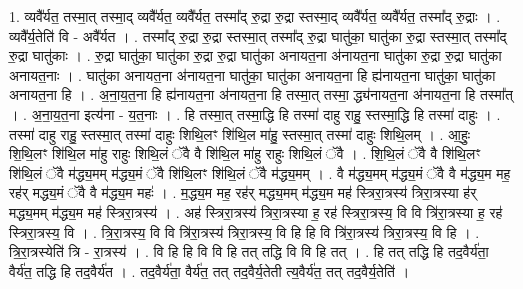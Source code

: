 \documentclass[17pt]{extarticle}
\begin{document}
1. व्यवै᳚र्यत॒ तस्मा॒त् तस्मा॒द् व्यवै᳚र्यत॒ व्यवै᳚र्यत॒ तस्मा᳚द् रु॒द्रा रु॒द्रा स्तस्मा॒द् व्यवै᳚र्यत॒ व्यवै᳚र्यत॒ तस्मा᳚द् रु॒द्राः । . व्यवै᳚र्य॒तेति॑ वि - अवै᳚र्यत । . तस्मा᳚द् रु॒द्रा रु॒द्रा स्तस्मा॒त् तस्मा᳚द् रु॒द्रा घातु॑का॒ घातु॑का रु॒द्रा स्तस्मा॒त् तस्मा᳚द् रु॒द्रा घातु॑काः । . रु॒द्रा घातु॑का॒ घातु॑का रु॒द्रा रु॒द्रा घातु॑का अनायत॒ना अ॑नायत॒ना घातु॑का रु॒द्रा रु॒द्रा घातु॑का अनायत॒नाः । . घातु॑का अनायत॒ना अ॑नायत॒ना घातु॑का॒ घातु॑का अनायत॒ना हि ह्य॑नायत॒ना घातु॑का॒ घातु॑का अनायत॒ना हि । . अ॒ना॒य॒त॒ना हि ह्य॑नायत॒ना अ॑नायत॒ना हि तस्मा॒त् तस्मा॒ द्ध्य॑नायत॒ना अ॑नायत॒ना हि तस्मा᳚त् । . अ॒ना॒य॒त॒ना इत्य॑ना - य॒त॒नाः । . हि तस्मा॒त् तस्मा॒द्धि हि तस्मा॑ दाहु राहु॒ स्तस्मा॒द्धि हि तस्मा॑ दाहुः । . तस्मा॑ दाहु राहु॒ स्तस्मा॒त् तस्मा॑ दाहुः शिथि॒लꣳ शि॑थि॒ल मा॑हु॒ स्तस्मा॒त् तस्मा॑ दाहुः शिथि॒लम् । . आ॒हुः॒ शि॒थि॒लꣳ शि॑थि॒ल मा॑हु राहुः शिथि॒लं ॅवै वै शि॑थि॒ल मा॑हु राहुः शिथि॒लं ॅवै । . शि॒थि॒लं ॅवै वै शि॑थि॒लꣳ शि॑थि॒लं ॅवै म॑द्ध्य॒मम् म॑द्ध्य॒मं ॅवै शि॑थि॒लꣳ शि॑थि॒लं ॅवै म॑द्ध्य॒मम् । . वै म॑द्ध्य॒मम् म॑द्ध्य॒मं ॅवै वै म॑द्ध्य॒म मह॒ रह॑र् मद्ध्य॒मं ॅवै वै म॑द्ध्य॒म महः॑ । . म॒द्ध्य॒म मह॒ रह॑र् मद्ध्य॒मम् म॑द्ध्य॒म मह॑ स्त्रिरा॒त्रस्य॑ त्रिरा॒त्रस्या ह॑र् मद्ध्य॒मम् म॑द्ध्य॒म मह॑ स्त्रिरा॒त्रस्य॑ । . अह॑ स्त्रिरा॒त्रस्य॑ त्रिरा॒त्रस्या ह॒ रह॑ स्त्रिरा॒त्रस्य॒ वि वि त्रि॑रा॒त्रस्या ह॒ रह॑ स्त्रिरा॒त्रस्य॒ वि । . त्रि॒रा॒त्रस्य॒ वि वि त्रि॑रा॒त्रस्य॑ त्रिरा॒त्रस्य॒ वि हि हि वि त्रि॑रा॒त्रस्य॑ त्रिरा॒त्रस्य॒ वि हि । . त्रि॒रा॒त्रस्येति॑ त्रि - रा॒त्रस्य॑ । . वि हि हि वि वि हि तत् तद्धि वि वि हि तत् । . हि तत् तद्धि हि तद॒वैर्य॑ता॒ वैर्य॑त॒ तद्धि हि तद॒वैर्य॑त । . तद॒वैर्य॑ता॒ वैर्य॑त॒ तत् तद॒वैर्य॒तेती त्य॒वैर्य॑त॒ तत् तद॒वैर्य॒तेति॑ । \newline
\end{document}
